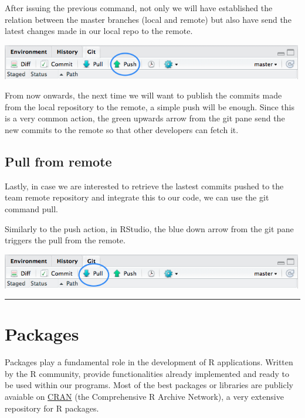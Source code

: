 \documentclass[]{article}
\begin{document}
After issuing the previous command, not only we will have established
the relation between the master branches (local and remote) but also
have send the latest changes made in our local repo to the remote.

\begin{center}\includegraphics[width=500px]{figures/push_btn} \end{center}

From now onwards, the next time we will want to publish the commits made
from the local repository to the remote, a simple push will be enough.
Since this is a very common action, the green upwards arrow from the git
pane send the new commits to the remote so that other developers can
fetch it.

\subsection{Pull from remote}\label{pull-from-remote}

Lastly, in case we are interested to retrieve the lastest commits pushed
to the team remote repository and integrate this to our code, we can use
the git command pull.

Similarly to the push action, in RStudio, the blue down arrow from the
git pane triggers the pull from the remote.

\begin{center}\includegraphics[width=500px]{figures/pull_btn} \end{center}

\begin{center}\rule{0.5\linewidth}{\linethickness}\end{center}

\section{Packages}\label{packages}

Packages play a fundamental role in the development of R applications.
Written by the R community, provide functionalities already implemented
and ready to be used within our programs. Most of the best packages or
libraries are publicly avaiable on
\href{https://cran.r-project.org/}{CRAN} (the Comprehensive R Archive
Network), a very extensive repository for R packages.
\end{document}
